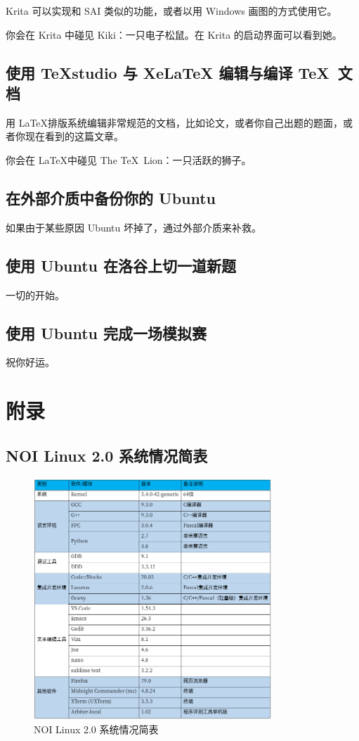 \documentclass[UTF-8]{ctexart}
\begin{document}
			Krita 可以实现和 SAI 类似的功能，或者以用 Windows 画图的方式使用它。
			
			你会在 Krita 中碰见 Kiki：一只电子松鼠。在 Krita 的启动界面可以看到她。
			
		\subsection{使用 TeXstudio 与 XeLaTeX 编辑与编译 \TeX ~文档}
			
			用 \LaTeX 排版系统编辑非常规范的文档，比如论文，或者你自己出题的题面，或者你现在看到的这篇文章。
			
			你会在 \LaTeX 中碰见 The \TeX ~Lion：一只活跃的狮子。
			
		\subsection{在外部介质中备份你的 Ubuntu}
		
			如果由于某些原因 Ubuntu 坏掉了，通过外部介质来补救。
			
		\subsection{使用 Ubuntu 在洛谷上切一道新题}
		
			一切的开始。
			
		\subsection{使用 Ubuntu 完成一场模拟赛}
		
			祝你好运。
	
	\newpage
	
	\section{附录}
	
		\subsection{NOI Linux 2.0 系统情况简表}
			
			\begin{figure}[H]
				\centering
				\includegraphics[width=0.8\textwidth]{fig/noilinux_support.png}
				\caption*{NOI Linux 2.0 系统情况简表}
			\end{figure}
			
\end{document}
